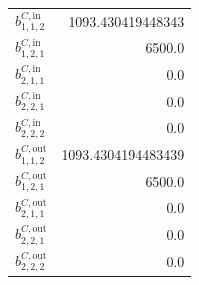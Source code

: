 \documentclass{article}%
\begin{document}
\begin{multicols*}{3}
\begin{supertabular}{lr}
	$b_{1,1,2}^{C,\text{in}}$ & 1093.430419448343 \\%
	$b_{1,2,1}^{C,\text{in}}$ & 6500.0 \\%
	$b_{2,1,1}^{C,\text{in}}$ & 0.0 \\%
	$b_{2,2,1}^{C,\text{in}}$ & 0.0 \\%
	$b_{2,2,2}^{C,\text{in}}$ & 0.0 \\%
	$b_{1,1,2}^{C,\text{out}}$ & 1093.4304194483439 \\%
	$b_{1,2,1}^{C,\text{out}}$ & 6500.0 \\%
	$b_{2,1,1}^{C,\text{out}}$ & 0.0 \\%
	$b_{2,2,1}^{C,\text{out}}$ & 0.0 \\%
	$b_{2,2,2}^{C,\text{out}}$ & 0.0 \\%
\end{supertabular}%
\end{multicols*}%
\end{document}
